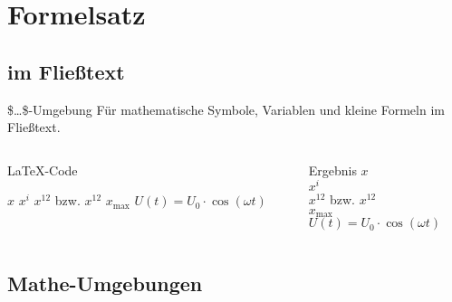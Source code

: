 \section{Formelsatz}

\subsection{im Fließtext}

\begin{frame}[fragile]{\$\dots \$-Umgebung}
  Für mathematische Symbole, Variablen und kleine Formeln im Fließtext.

  \begin{columns}[T]
    \begin{column}{0.6\textwidth}
      \begin{block}{\LaTeX-Code}
        \begin{lstverbatim}
        $x$
        $x^i$
        $x^12$ bzw. $x^{12}$ %
        $x_\text{max}$
        $U(t) = U_0 \cdot \cos(\omega t)$
        \end{lstverbatim}
      \end{block}
    \end{column}
    \begin{column}{0.35\textwidth}
      \begin{block}{Ergebnis}
        $x$  \\
        $x^i$ \\
        $x^12$ bzw. $x^{12}$ \\
        $x_\text{max}$ \\
        $U(t) = U_0 \cdot \cos(\omega t)$
      \end{block}
    \end{column}
  \end{columns}
\end{frame}

\subsection{Mathe-Umgebungen}

